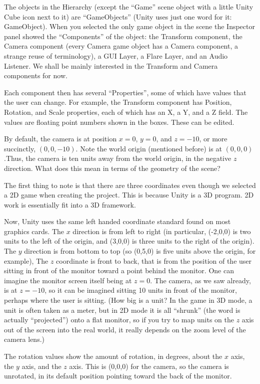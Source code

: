 \documentclass[12pt]{amsbook}
\theoremstyle{definition}
\theoremstyle{remark}
\numberwithin{figure}{chapter}
\numberwithin{table}{chapter}
\numberwithin{section}{chapter}
\numberwithin{equation}{section}
\begin{document}
The objects in the Hierarchy (except the ``Game'' scene object with a little Unity Cube icon next to it) are ``GameObjects'' (Unity uses just one word for it: GameObject). When you selected the only game object in the scene the Inspector panel showed the ``Components'' of the object: the Transform component, the Camera component (every Camera game object has a Camera component, a strange reuse of terminology), a GUI Layer, a Flare Layer, and an Audio Listener.  We shall be mainly interested in the Transform and Camera components for now.

Each component then has several ``Properties'', some of which have values that the user can change.  For example, the Transform component has Position, Rotation, and Scale properties, each of which has an X, a Y, and a Z field.  The values are floating point numbers shown in the boxes.  These can be edited.

By default, the camera is at position $x=0$, $y=0$, and $z=-10$, or more succinctly, $(0,0,-10)$.  Note the world origin (mentioned before) is at $(0,0,0)$.Thus, the camera is ten units away from the world origin, in the negative $z$ direction.  What does this mean in terms of the geometry of the scene?

The first thing to note is that there are three coordinates even though we selected a 2D game when creating the project.  This is because Unity is a 3D program.  2D work is essentially fit into a 3D framework.

Now, Unity uses the same left handed coordinate standard found on most graphics cards.  The $x$ direction is from left to right (in particular, (-2,0,0) is two units to the left of the origin, and (3,0,0) is three units to the right of the origin).  The $y$ direction is from bottom to top (so (0,5,0) is five units above the origin, for example),  The $z$ coordinate is front to back, that is from the position of the user sitting in front of the monitor toward a point behind the monitor.  One can imagine the monitor screen itself being at $z=0$.  The camera, as we saw already, is at $z=-10$, so it can be imagined sitting 10 units in front of the monitor, perhaps where the user is sitting.  (How big is a unit? In the game in 3D mode, a unit is often taken as a meter, but in 2D mode it is all ``shrunk'' (the word is actually ``projected'') onto a flat monitor, so if you try to map units on the $z$ axis out of the screen into the real world, it really depends on the zoom level of the camera lens.)

The rotation values show the amount of rotation, in degrees, about the $x$ axis, the $y$ axis, and the $z$ axis.  This is (0,0,0) for the camera, so the camera is unrotated, in its default position pointing toward the back of the monitor.
\end{document}
